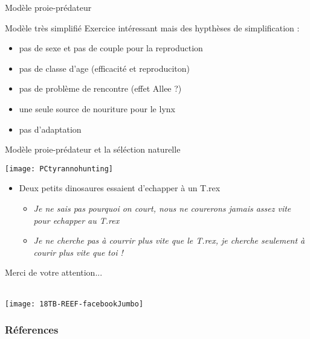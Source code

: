 \documentclass[10pt]{beamer}
\begin{document}
\begin{frame}{Modèle proie-prédateur}
 
  \begin{block}{Modèle très simplifié}
    Exercice intéressant mais des hypthèses de simplification :
    \begin{itemize}[<+->]
    \item pas de sexe et pas de couple pour la reproduction
    \item pas de classe d'age (efficacité et reproduciton)
    \item pas de problème de rencontre (effet Allee ?)
    \item une seule source de nouriture pour le lynx
    \item pas d'adaptation
    \end{itemize}
    
  \end{block}
  
  \end{frame}





\begin{frame}{Modèle proie-prédateur et la séléction naturelle}
  \begin{center}
    \texttt{[image: PCtyrannohunting]}
  \end{center}
  \begin{itemize}[<+->]
  \item Deux petits dinosaures essaient d'echapper à un T.rex
    \begin{itemize}
    \item \textit{Je ne sais pas pourquoi on court, nous ne courerons jamais assez
        vite pour echapper au T.rex}
    \item \textit{Je ne cherche pas à courrir plus vite que le T.rex, je cherche
        seulement à courir plus vite que toi !} 
    \end{itemize}
  \end{itemize}
\end{frame}


\begin{frame}[plain]
  \begin{center}
    \begin{huge}
      Merci de votre attention...\\~\\
    \end{huge}
    \texttt{[image: 18TB-REEF-facebookJumbo]}
  \end{center}
\end{frame}

\begin{frame}[allowframebreaks]
  \begin{tiny}
    \frametitle{Réferences}
    
    
  \end{tiny}
\end{frame}
\end{document}
